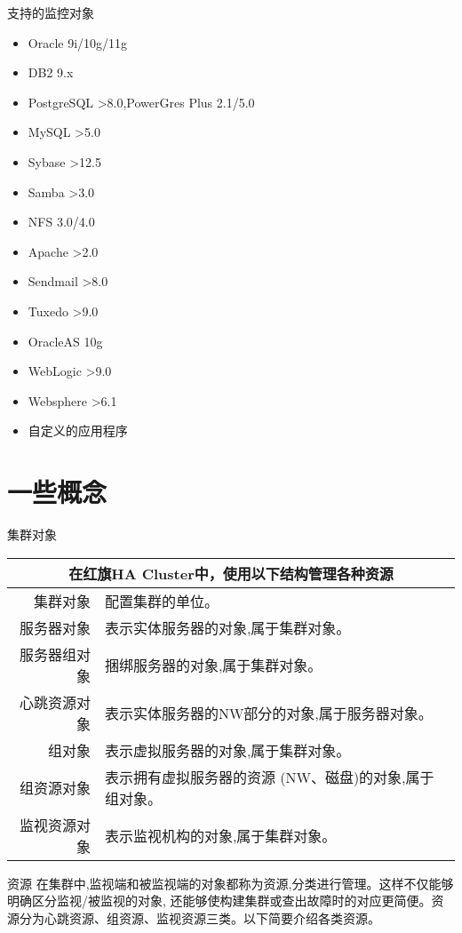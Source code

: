 \documentclass[compress,trans]{beamer} %
\begin{document}
\begin{frame}{支持的监控对象}
\begin{itemize}
  \item Oracle 9i/10g/11g
  \item DB2	9.x
  \item PostgreSQL >8.0,PowerGres Plus 2.1/5.0
  \item MySQL >5.0
  \item Sybase  >12.5
  \item Samba	>3.0
  \item NFS		3.0/4.0
  \item Apache	>2.0
  \item Sendmail >8.0
  \item Tuxedo	>9.0
  \item OracleAS 10g
  \item WebLogic >9.0
  \item Websphere >6.1
  \item 自定义的应用程序
\end{itemize}
\end{frame}

\section{一些概念}
\begin{frame}{集群对象}

\begin{tabular}{rp{7cm}}
\multicolumn{2}{c}{在红旗HA Cluster中，使用以下结构管理各种资源} \\
\hline \hline

集群对象 & 		配置集群的单位。\\
服务器对象 &		表示实体服务器的对象,属于集群对象。\\
服务器组对象 & 	捆绑服务器的对象,属于集群对象。\\
心跳资源对象 & 	表示实体服务器的NW部分的对象,属于服务器对象。\\
组对象 & 		表示虚拟服务器的对象,属于集群对象。\\
组资源对象 & 	表示拥有虚拟服务器的资源 (NW、磁盘)的对象,属于组对象。\\
监视资源对象 & 	表示监视机构的对象,属于集群对象。\\
\end{tabular}
\end{frame}

\begin{frame}{资源}
在集群中,监视端和被监视端的对象都称为资源,分类进行管理。这样不仅能够明确区分监视/被监视的对象,
     还能够使构建集群或查出故障时的对应更简便。资源分为心跳资源、组资源、监视资源三类。以下简要介绍各类资源。
\end{frame}
\end{document}
